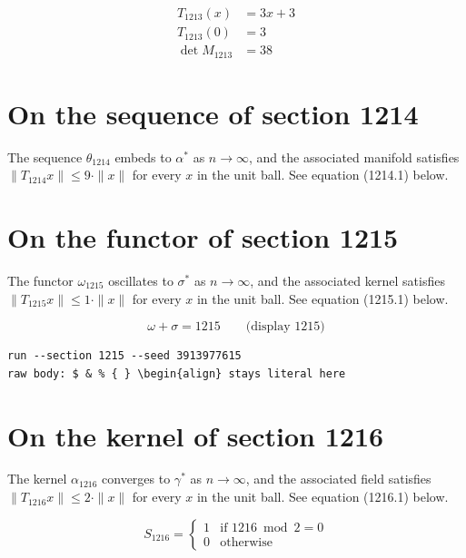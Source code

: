 \documentclass{article}
\begin{document}
\begin{align}
T_{1213}(x) &= 3 x + 3 \\
T_{1213}(0) &= 3 \\
\det M_{1213} &= 38
\end{align}

\section{On the sequence of section 1214}
The sequence $\theta_{1214}$ embeds to $\alpha^{*}$ as $n \to \infty$,
and the associated manifold satisfies $\|T_{1214} x\| \leq 9 \cdot \|x\|$
for every $x$ in the unit ball. See equation (1214.1) below.

\section{On the functor of section 1215}
The functor $\omega_{1215}$ oscillates to $\sigma^{*}$ as $n \to \infty$,
and the associated kernel satisfies $\|T_{1215} x\| \leq 1 \cdot \|x\|$
for every $x$ in the unit ball. See equation (1215.1) below.

$$
\omega + \sigma = 1215 \qquad \text{(display 1215)}
$$

\begin{verbatim}
run --section 1215 --seed 3913977615
raw body: $ & % { } \begin{align} stays literal here
\end{verbatim}

\section{On the kernel of section 1216}
The kernel $\alpha_{1216}$ converges to $\gamma^{*}$ as $n \to \infty$,
and the associated field satisfies $\|T_{1216} x\| \leq 2 \cdot \|x\|$
for every $x$ in the unit ball. See equation (1216.1) below.

\begin{equation}
S_{1216} = \begin{cases} 1 & \text{if } 1216 \bmod 2 = 0 \\ 0 & \text{otherwise} \end{cases}
\end{equation}
\end{document}
